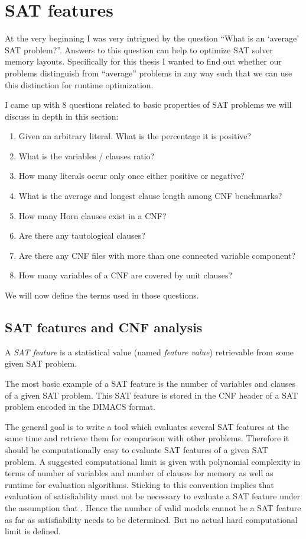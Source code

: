 \chapter{SAT features}
\label{ch:features}
%
At the very beginning I was very intrigued by the question
\enquote{What is an \enquote{average} SAT problem?}. Answers to this
question can help to optimize SAT solver memory layouts.
Specifically for this thesis I wanted to find out whether
our problems distinguish from \enquote{average} problems in any
way such that we can use this distinction for runtime optimization.

I came up with 8 questions related to basic properties of SAT problems
we will discuss in depth in this section:
\begin{enumerate}
\item Given an arbitrary literal. What is the percentage it is positive?
\item What is the variables / clauses ratio?
\item How many literals occur only once either positive or negative?
\item What is the average and longest clause length among CNF benchmarks?
\item How many Horn clauses exist in a CNF?
\item Are there any tautological clauses?
\item Are there any CNF files with more than one connected variable component?
\item How many variables of a CNF are covered by unit clauses?
\end{enumerate}

We will now define the terms used in those questions.

\section{SAT features and CNF analysis}
\label{sec:features-analysis}
%
\begin{defi}
  A \emph{SAT feature} is a statistical value (named \emph{feature value})
  retrievable from some given SAT problem.
\end{defi}

The most basic example of a SAT feature is the number of variables and clauses
of a given SAT problem. This SAT feature is stored in the CNF header of a SAT
problem encoded in the DIMACS format.

The general goal is to write a tool which evaluates several SAT features at the same
time and retrieve them for comparison with other problems. Therefore it should be
computationally easy to evaluate SAT features of a given SAT problem. A suggested
computational limit is given with polynomial complexity in terms of number of
variables and number of clauses for memory as well as runtime for evaluation algorithms.
Sticking to this convention implies that evaluation of satisfiability must not be
necessary to evaluate a SAT feature under the assumption that \cPneqNP. Hence the
number of valid models cannot be a SAT feature as far as satisfiability needs to
be determined. But no actual hard computational limit is defined.

